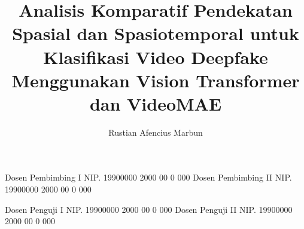 \documentclass[article]{report} %
\begin{document}
    
    \title{Analisis Komparatif Pendekatan Spasial dan Spasiotemporal untuk Klasifikasi Video Deepfake Menggunakan Vision Transformer dan VideoMAE}
    
	\author{Rustian Afencius Marbun}		%
	
	\dosbingA%
		{Dosen Pembimbing I}%
		{NIP. 19900000 2000 00 0 000}	%
	\dosbingB%
		{Dosen Pembimbing II}%
		{NIP. 19900000 2000 00 0 000}	%
		
	\pengujiA%
		{Dosen Penguji I}%
		{NIP. 19900000 2000 00 0 000}	%
	\pengujiB%
		{Dosen Penguji II}%
		{NIP. 19900000 2000 00 0 000}	%

	\sloppy %
    \setcounter{page}{1} %
\end{document}
